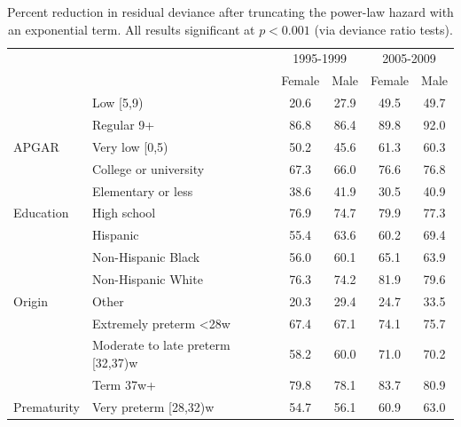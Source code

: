 \documentclass[smallextended]{svjour3} %
\begin{document}
\begin{table}[t]

\caption{\label{tab:tab-deviances}Percent reduction in residual deviance after truncating the power-law hazard with an exponential term. All results significant at $p<0.001$ (via deviance ratio tests).}
\centering
\begin{tabular}{llcccc}
\toprule
\multicolumn{2}{c}{ } & \multicolumn{2}{c}{1995-1999} & \multicolumn{2}{c}{2005-2009} \\
\cmidrule(l{3pt}r{3pt}){3-4} \cmidrule(l{3pt}r{3pt}){5-6}
 &  & Female & Male & Female & Male\\
\midrule
 & Low [5,9) & 20.6 & 27.9 & 49.5 & 49.7\\

 & Regular 9+ & 86.8 & 86.4 & 89.8 & 92.0\\

\multirow{-3}{*}{\raggedright\arraybackslash APGAR} & Very low [0,5) & 50.2 & 45.6 & 61.3 & 60.3\\
\cmidrule{1-6}
 & College or university & 67.3 & 66.0 & 76.6 & 76.8\\

 & Elementary or less & 38.6 & 41.9 & 30.5 & 40.9\\

\multirow{-3}{*}{\raggedright\arraybackslash Education} & High school & 76.9 & 74.7 & 79.9 & 77.3\\
\cmidrule{1-6}
 & Hispanic & 55.4 & 63.6 & 60.2 & 69.4\\

 & Non-Hispanic Black & 56.0 & 60.1 & 65.1 & 63.9\\

 & Non-Hispanic White & 76.3 & 74.2 & 81.9 & 79.6\\

\multirow{-4}{*}{\raggedright\arraybackslash Origin} & Other & 20.3 & 29.4 & 24.7 & 33.5\\
\cmidrule{1-6}
 & Extremely preterm <28w & 67.4 & 67.1 & 74.1 & 75.7\\

 & Moderate to late preterm [32,37)w & 58.2 & 60.0 & 71.0 & 70.2\\

 & Term 37w+ & 79.8 & 78.1 & 83.7 & 80.9\\

\multirow{-4}{*}{\raggedright\arraybackslash Prematurity} & Very preterm [28,32)w & 54.7 & 56.1 & 60.9 & 63.0\\
\bottomrule
\end{tabular}
\end{table}
\end{document}
